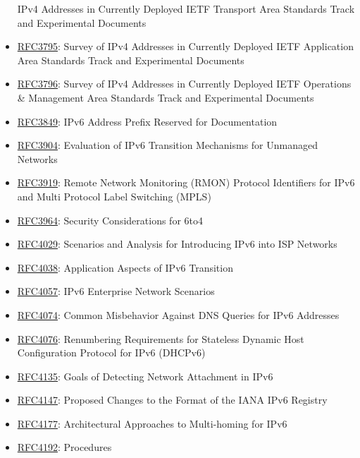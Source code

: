 \documentclass[
]{article}
\begin{document}
\begin{itemize}
  IPv4 Addresses in Currently Deployed IETF Transport Area Standards
  Track and Experimental Documents
\item
  \href{https://www.rfc-editor.org/info/rfc3795}{RFC3795}: Survey of
  IPv4 Addresses in Currently Deployed IETF Application Area Standards
  Track and Experimental Documents
\item
  \href{https://www.rfc-editor.org/info/rfc3796}{RFC3796}: Survey of
  IPv4 Addresses in Currently Deployed IETF Operations \& Management
  Area Standards Track and Experimental Documents
\item
  \href{https://www.rfc-editor.org/info/rfc3849}{RFC3849}: IPv6 Address
  Prefix Reserved for Documentation
\item
  \href{https://www.rfc-editor.org/info/rfc3904}{RFC3904}: Evaluation of
  IPv6 Transition Mechanisms for Unmanaged Networks
\item
  \href{https://www.rfc-editor.org/info/rfc3919}{RFC3919}: Remote
  Network Monitoring (RMON) Protocol Identifiers for IPv6 and Multi
  Protocol Label Switching (MPLS)
\item
  \href{https://www.rfc-editor.org/info/rfc3964}{RFC3964}: Security
  Considerations for 6to4
\item
  \href{https://www.rfc-editor.org/info/rfc4029}{RFC4029}: Scenarios and
  Analysis for Introducing IPv6 into ISP Networks
\item
  \href{https://www.rfc-editor.org/info/rfc4038}{RFC4038}: Application
  Aspects of IPv6 Transition
\item
  \href{https://www.rfc-editor.org/info/rfc4057}{RFC4057}: IPv6
  Enterprise Network Scenarios
\item
  \href{https://www.rfc-editor.org/info/rfc4074}{RFC4074}: Common
  Misbehavior Against DNS Queries for IPv6 Addresses
\item
  \href{https://www.rfc-editor.org/info/rfc4076}{RFC4076}: Renumbering
  Requirements for Stateless Dynamic Host Configuration Protocol for
  IPv6 (DHCPv6)
\item
  \href{https://www.rfc-editor.org/info/rfc4135}{RFC4135}: Goals of
  Detecting Network Attachment in IPv6
\item
  \href{https://www.rfc-editor.org/info/rfc4147}{RFC4147}: Proposed
  Changes to the Format of the IANA IPv6 Registry
\item
  \href{https://www.rfc-editor.org/info/rfc4177}{RFC4177}: Architectural
  Approaches to Multi-homing for IPv6
\item
  \href{https://www.rfc-editor.org/info/rfc4192}{RFC4192}: Procedures

\end{itemize}
\end{document}
